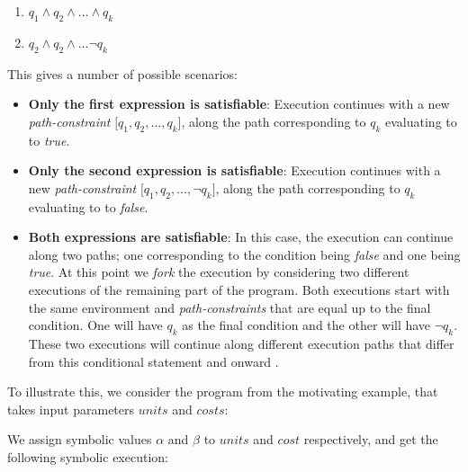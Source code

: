 		\begin{enumerate}
			\item $ q_1 \land q_2 \land \ldots \land q_k$
			\item $ q_2 \land q_2 \land \ldots \neg q_k$
		\end{enumerate}	
		This gives a number of possible scenarios:	
		\ifstm	
		\begin{itemize}
			\item \textbf{Only the first expression is satisfiable}: Execution continues with a new \emph{path-constraint} $\lbrack q_1, q_2, \ldots, q_k \rbrack$, along the path corresponding to $q_k$ evaluating to to \emph{true}.
			\item \textbf{Only the second expression is satisfiable}:  Execution continues with a new \emph{path-constraint} $\lbrack q_1, q_2, \ldots, \neg q_k \rbrack$, along the path corresponding to $q_k$ evaluating to to \emph{false}.
			
			\item \textbf{Both expressions are satisfiable}: In this case, the execution can continue along two paths; one corresponding to the condition being \emph{false} and one being \emph{true}. At this point we \emph{fork} the execution by considering two different executions of the remaining part of the program. Both executions start with the same environment and \emph{path-constraints} that are equal up to the final condition. One will have $q_k$ as the final condition and the other will have $\neg q_k$. 
			These two executions will continue along different execution paths that differ from this conditional statement and onward \cite{King76}.
		\end{itemize} 
		
		To illustrate this, we consider the program from the motivating example, that takes input parameters $units$ and $costs$:
		
		\motexample{}
		\newpage
		We assign symbolic values $\alpha$ and $\beta$ to $units$ and $cost$ respectively, and get the following symbolic execution:
		
